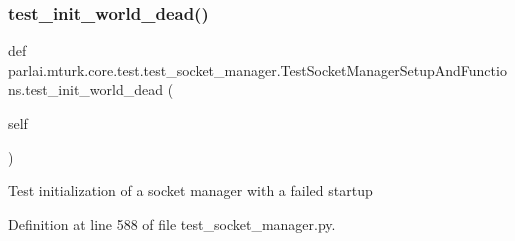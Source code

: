 \subsubsection{\texorpdfstring{test\+\_\+init\+\_\+world\+\_\+dead()}{test\_init\_world\_dead()}}
{\footnotesize\ttfamily def parlai.\+mturk.\+core.\+test.\+test\+\_\+socket\+\_\+manager.\+Test\+Socket\+Manager\+Setup\+And\+Functions.\+test\+\_\+init\+\_\+world\+\_\+dead (\begin{DoxyParamCaption}\item[{}]{self }\end{DoxyParamCaption})}

\begin{DoxyVerb}Test initialization of a socket manager with a failed startup\end{DoxyVerb}
 

Definition at line 588 of file test\+\_\+socket\+\_\+manager.\+py.



